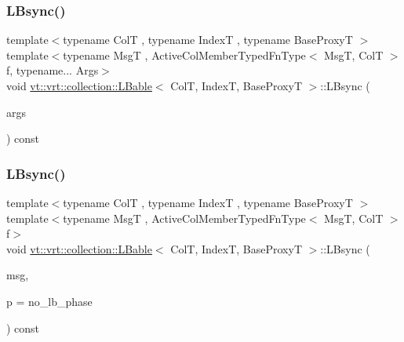 \mbox{\label{structvt_1_1vrt_1_1collection_1_1_l_bable_a9c11d9aaefd0d09c6813dc46aeda8496}} 
\subsubsection{\texorpdfstring{L\+Bsync()}{LBsync()}\hspace{0.1cm}{\footnotesize\ttfamily [1/4]}}
{\footnotesize\ttfamily template$<$typename ColT , typename IndexT , typename Base\+ProxyT $>$ \\
template$<$typename MsgT , Active\+Col\+Member\+Typed\+Fn\+Type$<$ Msg\+T, Col\+T $>$ f, typename... Args$>$ \\
void \hyperlink{structvt_1_1vrt_1_1collection_1_1_l_bable}{vt\+::vrt\+::collection\+::\+L\+Bable}$<$ ColT, IndexT, Base\+ProxyT $>$\+::L\+Bsync (\begin{DoxyParamCaption}\item[{Args \&\&...}]{args }\end{DoxyParamCaption}) const}

\mbox{\label{structvt_1_1vrt_1_1collection_1_1_l_bable_a7c891593867734d0e2e30cb1c6b23b44}} 
\subsubsection{\texorpdfstring{L\+Bsync()}{LBsync()}\hspace{0.1cm}{\footnotesize\ttfamily [2/4]}}
{\footnotesize\ttfamily template$<$typename ColT , typename IndexT , typename Base\+ProxyT $>$ \\
template$<$typename MsgT , Active\+Col\+Member\+Typed\+Fn\+Type$<$ Msg\+T, Col\+T $>$ f$>$ \\
void \hyperlink{structvt_1_1vrt_1_1collection_1_1_l_bable}{vt\+::vrt\+::collection\+::\+L\+Bable}$<$ ColT, IndexT, Base\+ProxyT $>$\+::L\+Bsync (\begin{DoxyParamCaption}\item[{MsgT $\ast$}]{msg,  }\item[{\hyperlink{namespacevt_a46ce6733d5cdbd735d561b7b4029f6d7}{Phase\+Type}}]{p = {\ttfamily no\+\_\+lb\+\_\+phase} }\end{DoxyParamCaption}) const}

